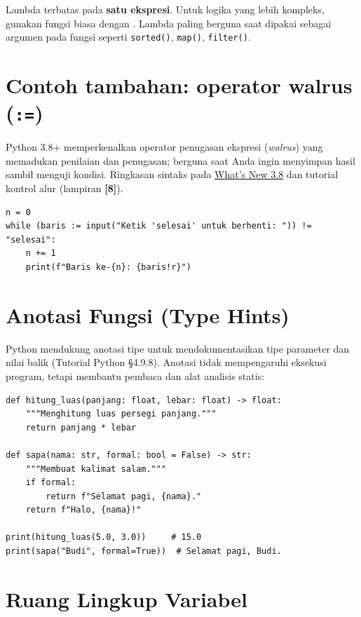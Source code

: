 ﻿\documentclass[../main.tex]{subfiles}
\begin{document}
\begin{konsep}
Lambda terbatas pada \textbf{satu ekspresi}. Untuk logika yang lebih kompleks, gunakan fungsi biasa dengan . Lambda paling berguna saat dipakai sebagai argumen pada fungsi seperti \texttt{sorted()}, \texttt{map()}, \texttt{filter()}.
\end{konsep}

\section{Contoh tambahan: operator walrus (\texttt{:=})}

\noindent Python 3.8+ memperkenalkan operator penugasan ekspresi (\textit{walrus}) yang memadukan penilaian dan penugasan; berguna saat Anda ingin menyimpan hasil sambil menguji kondisi. Ringkasan sintaks pada \href{https://docs.python.org/3/whatsnew/3.8.html}{What's New 3.8} dan tutorial kontrol alur (lampiran \textbf{[8]}).

\begin{lstlisting}[caption=Walrus pada kondisi while]
n = 0
while (baris := input("Ketik 'selesai' untuk berhenti: ")) != "selesai":
    n += 1
    print(f"Baris ke-{n}: {baris!r}")
\end{lstlisting}

\section{Anotasi Fungsi (Type Hints)}

Python mendukung anotasi tipe untuk mendokumentasikan tipe parameter dan nilai balik (Tutorial Python §4.9.8). Anotasi tidak mempengaruhi eksekusi program, tetapi membantu pembaca dan alat analisis statis:

\begin{lstlisting}[caption=Anotasi fungsi / type hints]
def hitung_luas(panjang: float, lebar: float) -> float:
    """Menghitung luas persegi panjang."""
    return panjang * lebar

def sapa(nama: str, formal: bool = False) -> str:
    """Membuat kalimat salam."""
    if formal:
        return f"Selamat pagi, {nama}."
    return f"Halo, {nama}!"

print(hitung_luas(5.0, 3.0))     # 15.0
print(sapa("Budi", formal=True))  # Selamat pagi, Budi.
\end{lstlisting}

\section{Ruang Lingkup Variabel}
\end{document}
